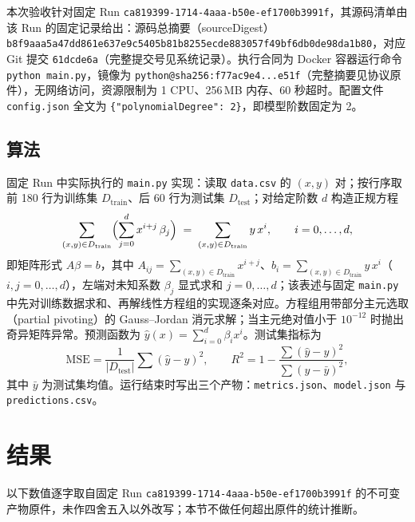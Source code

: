 \documentclass[a4paper,11pt]{article}
\begin{document}
本次验收针对固定 Run \texttt{ca819399-1714-4aaa-}\allowbreak\texttt{b50e-ef1700b3991f}，其源码清单由该 Run 的固定记录给出：源码总摘要（sourceDigest）\texttt{b8f9aaa5a47dd861e637e9c5405b81b8255ecde8}\allowbreak\texttt{83057f49bf6db0de98da1b80}，对应 Git 提交 \texttt{61dcde6a}（完整提交号见系统记录）。执行合同为 Docker 容器运行命令 \texttt{python main.py}，镜像为 \texttt{python@sha256:f77ac9e4...e51f}（完整摘要见协议原件），无网络访问，资源限制为 1 CPU、256\,MB 内存、60 秒超时。配置文件 \texttt{config.json} 全文为 \texttt{\{"polynomialDegree": 2\}}，即模型阶数固定为 2。

\subsection{算法}

固定 Run 中实际执行的 \texttt{main.py} 实现：读取 \texttt{data.csv} 的 $(x,y)$ 对；按行序取前 180 行为训练集 \(D_{\mathrm{train}}\)、后 60 行为测试集 \(D_{\mathrm{test}}\)；对给定阶数 \(d\) 构造正规方程
\begin{equation}
\sum_{(x,y)\in D_{\mathrm{train}}} \Bigl(\sum_{j=0}^{d} x^{i+j}\,\beta_j\Bigr) \;=\; \sum_{(x,y)\in D_{\mathrm{train}}} y\,x^{i}, \qquad i=0,\dots,d,
\label{eq:normal}
\end{equation}
即矩阵形式 $A\beta=b$，其中 $A_{ij}=\sum_{(x,y)\in D_{\mathrm{train}}} x^{i+j}$、$b_i=\sum_{(x,y)\in D_{\mathrm{train}}} y\,x^{i}$（$i,j=0,\dots,d$），左端对未知系数 $\beta_j$ 显式求和 $j=0,\dots,d$；该表述与固定 \texttt{main.py} 中先对训练数据求和、再解线性方程组的实现逐条对应。方程组用带部分主元选取（partial pivoting）的 Gauss--Jordan 消元求解；当主元绝对值小于 $10^{-12}$ 时抛出奇异矩阵异常。预测函数为 $\hat y(x)=\sum_{i=0}^{d}\beta_i x^i$。测试集指标为
\begin{equation}
\mathrm{MSE} = \frac{1}{|D_{\mathrm{test}}|}\sum (\hat y - y)^2, \qquad
R^2 = 1 - \frac{\sum (\hat y - y)^2}{\sum (y - \bar y)^2},
\label{eq:metrics}
\end{equation}
其中 $\bar y$ 为测试集均值。运行结束时写出三个产物：\texttt{metrics.json}、\texttt{model.json} 与 \texttt{predictions.csv}。

\section{结果}

以下数值逐字取自固定 Run \texttt{ca819399-1714-4aaa-}\allowbreak\texttt{b50e-ef1700b3991f} 的不可变产物原件，未作四舍五入以外改写；本节不做任何超出原件的统计推断。
\end{document}

